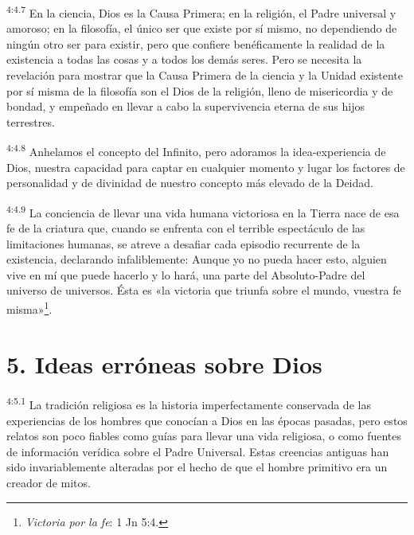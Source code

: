 \par
\textsuperscript{4:4.7} En la ciencia, Dios es la Causa Primera; en la religión, el Padre universal y amoroso; en la filosofía, el único ser que existe por sí mismo, no dependiendo de ningún otro ser para existir, pero que confiere benéficamente la realidad de la existencia a todas las cosas y a todos los demás seres. Pero se necesita la revelación para mostrar que la Causa Primera de la ciencia y la Unidad existente por sí misma de la filosofía son el Dios de la religión, lleno de misericordia y de bondad, y empeñado en llevar a cabo la supervivencia eterna de sus hijos terrestres.

\par
\textsuperscript{4:4.8} Anhelamos el concepto del Infinito, pero adoramos la idea-experiencia de Dios, nuestra capacidad para captar en cualquier momento y lugar los factores de personalidad y de divinidad de nuestro concepto más elevado de la Deidad.

\par
\textsuperscript{4:4.9} La conciencia de llevar una vida humana victoriosa en la Tierra nace de esa fe de la criatura que, cuando se enfrenta con el terrible espectáculo de las limitaciones humanas, se atreve a desafiar cada episodio recurrente de la existencia, declarando infaliblemente: Aunque yo no pueda hacer esto, alguien vive en mí que puede hacerlo y lo hará, una parte del Absoluto-Padre del universo de universos. Ésta es «la victoria que triunfa sobre el mundo, vuestra fe misma»\footnote{\textit{Victoria por la fe}: 1 Jn 5:4.}.

\section*{5. Ideas erróneas sobre Dios}
\par
\textsuperscript{4:5.1} La tradición religiosa es la historia imperfectamente conservada de las experiencias de los hombres que conocían a Dios en las épocas pasadas, pero estos relatos son poco fiables como guías para llevar una vida religiosa, o como fuentes de información verídica sobre el Padre Universal. Estas creencias antiguas han sido invariablemente alteradas por el hecho de que el hombre primitivo era un creador de mitos.

